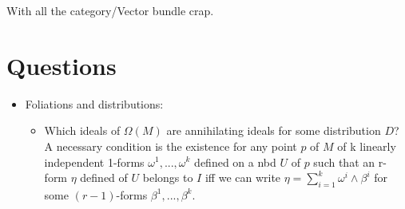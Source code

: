 \documentclass{report}
\theoremstyle{definition}
\begin{document}
\begin{itemize}
\begin{itemize}
        With all the category/Vector bundle crap.
    \end{itemize}
\end{itemize}

\section{Questions}

\begin{itemize}
    \item Foliations and distributions:
    \begin{itemize}
        \item Which ideals of $\Omega(M)$ are annihilating ideals for some distribution $D$? A necessary condition is the existence for any point $p$ of $M$ of k linearly independent 1-forms $\omega^1,...,\omega^k$ defined on a nbd $U$ of $p$ such that an r-form $\eta$ defined of $U$ belongs to $I$ iff we can write $\eta=\sum_{i=1}^k\omega^i\wedge\beta^i$ for some $(r-1)$-forms $\beta^1,...,\beta^k$.
    

\end{itemize}
\end{itemize}
\end{document}
